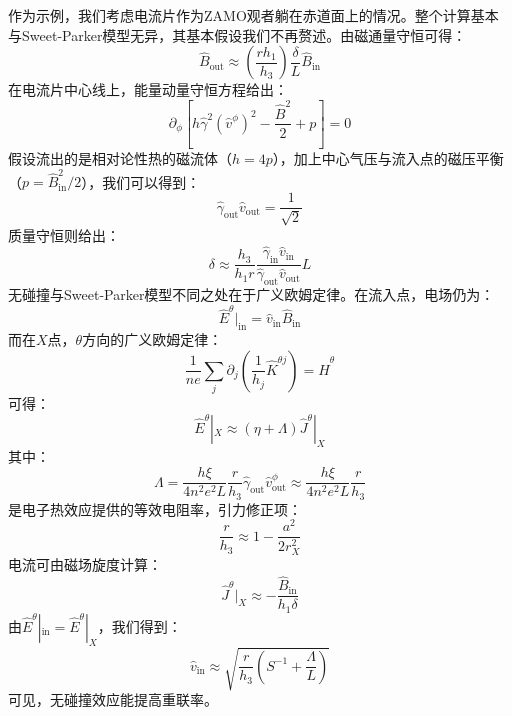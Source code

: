\documentclass[lang=cn,color=blue,cm,11pt,scheme=chinese,bibend=bibtex,sorting=nty]{elegantbook}
\begin{document}
	作为示例，我们考虑电流片作为ZAMO观者躺在赤道面上的情况。整个计算基本与Sweet-Parker模型无异，其基本假设我们不再赘述。由磁通量守恒可得：
	\begin{equation}
		\hat{B}_{\text{out}} \approx \left( \frac{r h_1}{h_3} \right) \frac{\delta}{L} \hat{B}_{\text{in}}
	\end{equation}
	在电流片中心线上，能量动量守恒方程给出：
	\begin{equation}
		\partial_{\phi} \left[ h \hat{\gamma}^2 (\hat{v}^{\phi})^2 - \frac{\hat{B}^2}{2} + p \right] = 0
	\end{equation}
	假设流出的是相对论性热的磁流体（$h = 4 p$），加上中心气压与流入点的磁压平衡（$p = \hat{B}^2_{\text{in}} / 2$），我们可以得到：
	\begin{equation}
		\hat{\gamma}_{\text{out}} \hat{v}_{\text{out}} = \frac{1}{\sqrt{2}}
	\end{equation}
	质量守恒则给出：
	\begin{equation}
		\delta \approx \frac{h_3}{h_1 r} \frac{\hat{\gamma}_{\text{in}} \hat{v}_{\text{in}}}{\hat{\gamma}_{\text{out}} \hat{v}_{\text{out}}} L
	\end{equation}
	无碰撞与Sweet-Parker模型不同之处在于广义欧姆定律。在流入点，电场仍为：
	\begin{equation}
		\hat{E}^{\theta} |_{\text{in}} = \hat{v}_{\text{in}} \hat{B}_{\text{in}}
	\end{equation}
	而在$X$点，$\theta$方向的广义欧姆定律：
	\begin{equation}
		\frac{1}{n e} \sum_j \partial_j \left( \frac{1}{h_j} \hat{K}^{\theta j} \right) = \hat{H}^{\theta}
	\end{equation}
	可得：
	\begin{equation}
		\hat{E}^{\theta} |_X \approx (\eta + \Lambda) \hat{J}^{\theta} |_X
	\end{equation}
	其中：
	\begin{equation}
		\Lambda = \frac{h \xi}{4 n^2 e^2 L} \frac{r}{h_3} \hat{\gamma}_{\text{out}} \hat{v}^{\phi}_{\text{out}} \approx \frac{h \xi}{4 n^2 e^2 L} \frac{r}{h_3}
	\end{equation}
	是电子热效应提供的等效电阻率，引力修正项：
	\begin{equation}
		\frac{r}{h_3} \approx 1 - \frac{a^2}{2 r^2_X}
	\end{equation}
	电流可由磁场旋度计算：
	\begin{equation}
		\hat{J}^{\theta} |_X \approx - \frac{\hat{B}_{\text{in}}}{h_1 \delta}
	\end{equation}
	由$\hat{E}^{\theta} |_{\text{in}} = \hat{E}^{\theta} |_X$，我们得到：
	\begin{equation}
		\hat{v}_{\text{in}} \approx \sqrt{\frac{r}{h_3} \left( S^{- 1} + \frac{\Lambda}{L} \right)}
	\end{equation}
	可见，无碰撞效应能提高重联率。
	
\end{document}
